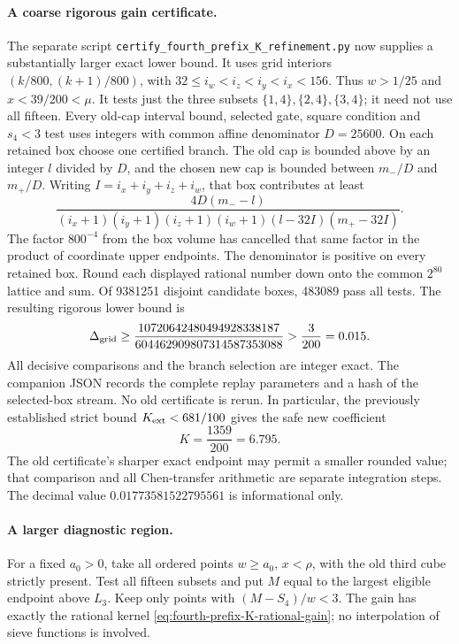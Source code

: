 \paragraph{A coarse rigorous gain certificate.}
The separate script \texttt{certify\_fourth\_prefix\_K\_refinement.py}
now supplies a substantially larger exact lower bound. It uses grid
interiors \((k/800,(k+1)/800)\), with
\(32\le i_w<i_z<i_y<i_x<156\). Thus \(w>1/25\) and
\(x<39/200<\mu\). It tests just the three subsets
\(\{1,4\},\{2,4\},\{3,4\}\); it need not use all fifteen.
Every old-cap interval bound, selected gate, square condition and
\(s_4<3\) test uses integers with common affine denominator
\(D=25600\). On each retained box choose one certified branch.
The old cap is bounded above by an integer \(l\) divided by \(D\),
and the chosen new cap is bounded between \(m_-/D\) and \(m_+/D\).
Writing \(I=i_x+i_y+i_z+i_w\), that box contributes at least
\[
 \frac{4D(m_--l)}
 {(i_x+1)(i_y+1)(i_z+1)(i_w+1)
             (l-32I)(m_+-32I)}.
\]
The factor \(800^{-4}\) from the box volume has cancelled that
same factor in the product of coordinate upper endpoints.
The denominator is positive on every retained box.
Round each displayed rational number down onto the common
\(2^{80}\) lattice and sum. Of 9381251 disjoint candidate boxes,
483089 pass all tests. The resulting rigorous lower bound is
\[
 \Delta_{\rm grid}\ge
 \frac{10720642480494928338187}{604462909807314587353088}
 >\frac{3}{200}=0.015.
\]
All decisive comparisons and the branch selection are integer exact.
The companion JSON records the complete replay parameters and a
hash of the selected-box stream. No old certificate is rerun.
In particular, the previously established strict bound
\(K_{\rm ext}<681/100\) gives the safe new coefficient
\[
 K=\frac{1359}{200}=6.795.
\]
The old certificate's sharper exact endpoint may permit a smaller
rounded value; that comparison and all Chen-transfer arithmetic
are separate integration steps. The decimal value
\(0.01773581522795561\) is informational only.

\paragraph{A larger diagnostic region.}
For a fixed \(a_0>0\), take all ordered points \(w\ge a_0\),
\(x<\rho\), with the old third cube strictly present.
Test all fifteen subsets and put \(M\) equal to the largest
eligible endpoint above \(L_3\).
Keep only points with \((M-S_4)/w<3\).
The gain has exactly the rational kernel
\eqref{eq:fourth-prefix-K-rational-gain}; no interpolation of
sieve functions is involved.

